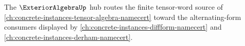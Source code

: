 The $\ExteriorAlgebraUp$ hub routes the finite tensor-word source of \autoref{ch:concrete-instances-tensor-algebra-namecert} toward the alternating-form consumers displayed by \autoref{ch:concrete-instances-diffform-namecert} and \autoref{ch:concrete-instances-derham-namecert}.



